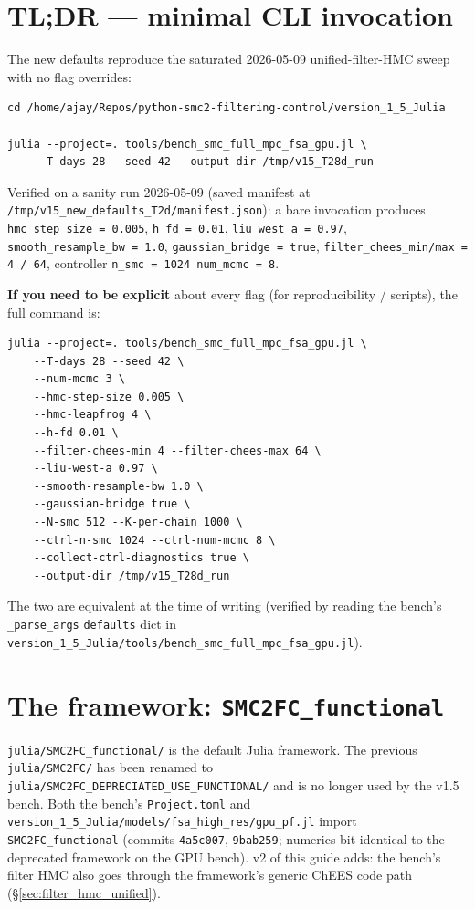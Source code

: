 \documentclass[11pt,a4paper]{article}
\begin{document}
\section*{TL;DR --- minimal CLI invocation}

The new defaults reproduce the saturated 2026-05-09 unified-filter-HMC
sweep with no flag overrides:

\begin{verbatim}
cd /home/ajay/Repos/python-smc2-filtering-control/version_1_5_Julia

julia --project=. tools/bench_smc_full_mpc_fsa_gpu.jl \
    --T-days 28 --seed 42 --output-dir /tmp/v15_T28d_run
\end{verbatim}

\noindent
Verified on a sanity run 2026-05-09 (saved manifest at
\texttt{/tmp/v15\_new\_defaults\_T2d/manifest.json}): a bare
invocation produces \texttt{hmc\_step\_size = 0.005},
\texttt{h\_fd = 0.01}, \texttt{liu\_west\_a = 0.97},
\texttt{smooth\_resample\_bw = 1.0},
\texttt{gaussian\_bridge = true},
\texttt{filter\_chees\_min/max = 4 / 64},
controller \texttt{n\_smc = 1024 num\_mcmc = 8}.

\textbf{If you need to be explicit} about every flag (for
reproducibility / scripts), the full command is:

\begin{verbatim}
julia --project=. tools/bench_smc_full_mpc_fsa_gpu.jl \
    --T-days 28 --seed 42 \
    --num-mcmc 3 \
    --hmc-step-size 0.005 \
    --hmc-leapfrog 4 \
    --h-fd 0.01 \
    --filter-chees-min 4 --filter-chees-max 64 \
    --liu-west-a 0.97 \
    --smooth-resample-bw 1.0 \
    --gaussian-bridge true \
    --N-smc 512 --K-per-chain 1000 \
    --ctrl-n-smc 1024 --ctrl-num-mcmc 8 \
    --collect-ctrl-diagnostics true \
    --output-dir /tmp/v15_T28d_run
\end{verbatim}

The two are equivalent at the time of writing (verified by reading
the bench's \texttt{\_parse\_args} \texttt{defaults} dict in
\texttt{version\_1\_5\_Julia/tools/bench\_smc\_full\_mpc\_fsa\_gpu.jl}).

\tableofcontents


\section{The framework: \texttt{SMC2FC\_functional}}

\texttt{julia/SMC2FC\_functional/} is the default Julia framework.
The previous \texttt{julia/SMC2FC/} has been renamed to
\texttt{julia/SMC2FC\_DEPRECIATED\_USE\_FUNCTIONAL/} and is no longer
used by the v1.5 bench. Both the bench's \texttt{Project.toml} and
\texttt{version\_1\_5\_Julia/models/fsa\_high\_res/gpu\_pf.jl} import
\texttt{SMC2FC\_functional} (commits \texttt{4a5c007},
\texttt{9bab259}; numerics bit-identical to the deprecated framework
on the GPU bench). v2 of this guide adds: the bench's filter HMC
also goes through the framework's generic ChEES code path
(\S\ref{sec:filter_hmc_unified}).
\end{document}

